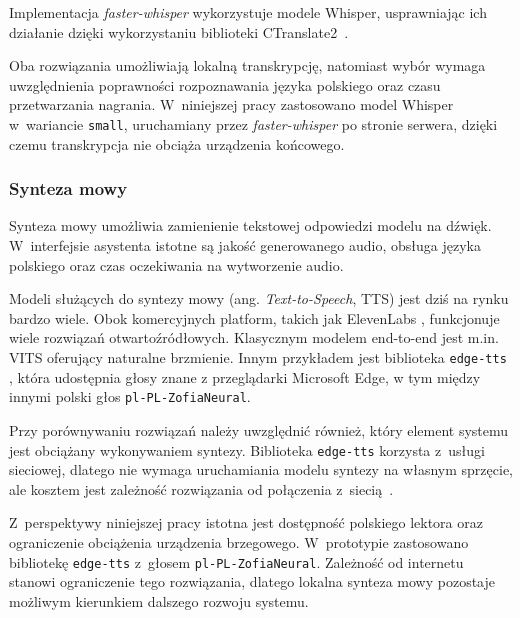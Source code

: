 Implementacja \textit{faster-whisper} wykorzystuje modele Whisper, usprawniając ich działanie dzięki wykorzystaniu biblioteki CTranslate2~\cite{FasterWhisper}.

Oba rozwiązania umożliwiają lokalną transkrypcję, natomiast wybór wymaga uwzględnienia poprawności rozpoznawania języka polskiego oraz czasu przetwarzania nagrania. W~niniejszej pracy zastosowano model Whisper w~wariancie \texttt{small}, uruchamiany przez \textit{faster-whisper} po stronie serwera, dzięki czemu transkrypcja nie obciąża urządzenia końcowego.

\subsubsection{Synteza mowy}
\label{subsubsec:tts}

Synteza mowy umożliwia zamienienie tekstowej odpowiedzi modelu na dźwięk. W~interfejsie asystenta istotne są jakość generowanego audio, obsługa języka polskiego oraz czas oczekiwania na wytworzenie audio.

Modeli służących do syntezy mowy (ang. \textit{Text-to-Speech}, TTS) jest dziś na rynku bardzo wiele. Obok komercyjnych platform, takich jak ElevenLabs \cite{ElevenLabs}, funkcjonuje wiele rozwiązań otwartoźródłowych. Klasycznym modelem end-to-end jest m.in. VITS \cite{Kim2021} oferujący naturalne brzmienie. Innym przykładem jest biblioteka \texttt{edge-tts} \cite{EdgeTTS}, która udostępnia głosy znane z przeglądarki Microsoft Edge, w tym między innymi polski głos \texttt{pl-PL-ZofiaNeural}.

Przy porównywaniu rozwiązań należy uwzględnić również, który element systemu jest obciążany wykonywaniem syntezy. Biblioteka \texttt{edge-tts} korzysta z~usługi sieciowej, dlatego nie wymaga uruchamiania modelu syntezy na własnym sprzęcie, ale kosztem jest zależność rozwiązania od połączenia z~siecią~\cite{EdgeTTS}.

Z~perspektywy niniejszej pracy istotna jest dostępność polskiego lektora oraz ograniczenie obciążenia urządzenia brzegowego. W~prototypie zastosowano bibliotekę \texttt{edge-tts} z~głosem \texttt{pl-PL-ZofiaNeural}. Zależność od internetu stanowi ograniczenie tego rozwiązania, dlatego lokalna synteza mowy pozostaje możliwym kierunkiem dalszego rozwoju systemu.
